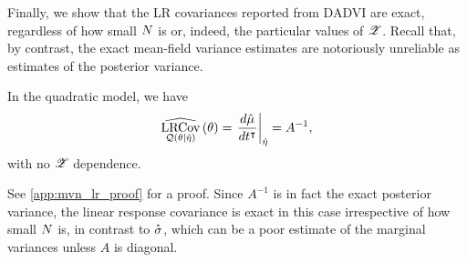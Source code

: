 Finally, we show that the LR covariances reported from DADVI
are exact, regardless of how small $N$ is or, indeed, the particular values of $\mathscr{Z}$.
Recall that, by contrast, the exact mean-field variance estimates are
notoriously unreliable as estimates of the posterior variance. 
%
\begin{proposition}\label{prop:mvn_lr}
%
In the quadratic model, we have
%
\begin{align*}
%
\lrcov{\q(\theta \vert \etahat)}{\theta} =
\fracat{d \etamuhat}{d t^\trans}{\etahat} = A^{-1},
%
\end{align*}
%
with no $\mathscr{Z}$ dependence.
\end{proposition}
%
See \cref{app:mvn_lr_proof} for a proof.
Since $A^{-1}$ is in fact the exact posterior variance,
the linear response covariance is exact in this case irrespective of how small
$N$ is, in contrast to $\accentset{*}{\sigma}_{}$, which can be a poor estimate of
the marginal variances unless $A$ is diagonal.
